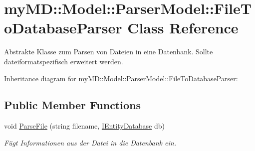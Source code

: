 \hypertarget{classmy_m_d_1_1_model_1_1_parser_model_1_1_file_to_database_parser}{
\section{my\-MD::Model::Parser\-Model::File\-To\-Database\-Parser Class Reference}
\label{df/d8f/classmy_m_d_1_1_model_1_1_parser_model_1_1_file_to_database_parser}
}
Abstrakte Klasse zum Parsen von Dateien in eine Datenbank. Sollte dateiformatspezifisch erweitert werden.  


Inheritance diagram for my\-MD::Model::Parser\-Model::File\-To\-Database\-Parser:\subsection*{Public Member Functions}
\begin{CompactItemize}
\item 
void \hyperlink{classmy_m_d_1_1_model_1_1_parser_model_1_1_file_to_database_parser_8ef40647d404611dade84e3f8f4e341c}{Parse\-File} (string filename, \hyperlink{interfacemy_m_d_1_1_model_1_1_database_model_1_1_i_entity_database}{IEntity\-Database} db)
\begin{CompactList}\small\item\em F\"{u}gt Informationen aus der Datei in die Datenbank ein. \item\end{CompactList}\end{CompactItemize}
